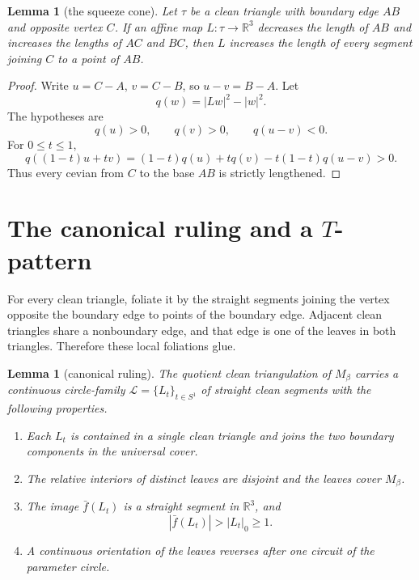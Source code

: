 \documentclass[11pt]{article}
\newtheorem{lemma}[theorem]{Lemma}
\newcommand{\R}{\mathbb R}
\begin{document}
\begin{lemma}[the squeeze cone]
Let \(\tau\) be a clean triangle with boundary edge \(AB\) and opposite vertex \(C\).  If an affine map \(L:\tau\to \R^3\) decreases the length of \(AB\) and increases the lengths of \(AC\) and \(BC\), then \(L\) increases the length of every segment joining \(C\) to a point of \(AB\).
\end{lemma}

\begin{proof}
Write \(u=C-A\), \(v=C-B\), so \(u-v=B-A\).  Let
\[
q(w)=|Lw|^2-|w|^2 .
\]
The hypotheses are
\[
q(u)>0,\qquad q(v)>0,\qquad q(u-v)<0.
\]
For \(0\le t\le 1\),
\[
q((1-t)u+tv)
=(1-t)q(u)+tq(v)-t(1-t)q(u-v)>0.
\]
Thus every cevian from \(C\) to the base \(AB\) is strictly lengthened.
\end{proof}

\section{The canonical ruling and a \(T\)-pattern}

For every clean triangle, foliate it by the straight segments joining the vertex opposite the boundary edge to points of the boundary edge.  Adjacent clean triangles share a nonboundary edge, and that edge is one of the leaves in both triangles.  Therefore these local foliations glue.

\begin{lemma}[canonical ruling]
The quotient clean triangulation of \(M_\beta\) carries a continuous circle-family \(\mathcal L=\{L_t\}_{t\in S^1}\) of straight clean segments with the following properties.
\begin{enumerate}[label=\textup{(\roman*)}]
\item Each \(L_t\) is contained in a single clean triangle and joins the two boundary components in the universal cover.
\item The relative interiors of distinct leaves are disjoint and the leaves cover \(M_\beta\).
\item The image \(\bar f(L_t)\) is a straight segment in \(\R^3\), and
\[
|\bar f(L_t)|>|L_t|_0\ge 1.
\]
\item A continuous orientation of the leaves reverses after one circuit of the parameter circle.
\end{enumerate}
\end{lemma}
\end{document}
